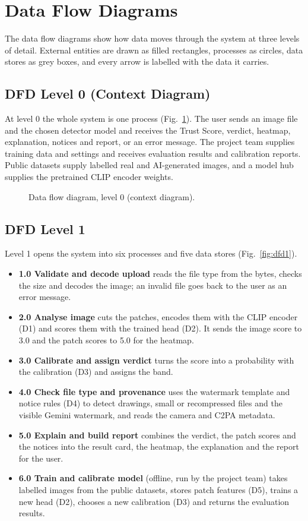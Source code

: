 \section{Data Flow Diagrams}
The data flow diagrams show how data moves through the system at three levels of detail. External entities are drawn as filled rectangles, processes as circles, data stores as grey boxes, and every arrow is labelled with the data it carries.

\subsection{DFD Level 0 (Context Diagram)}
At level 0 the whole system is one process (Fig.~\ref{fig:dfd0}). The user sends an image file and the chosen detector model and receives the Trust Score, verdict, heatmap, explanation, notices and report, or an error message. The project team supplies training data and settings and receives evaluation results and calibration reports. Public datasets supply labelled real and AI-generated images, and a model hub supplies the pretrained CLIP encoder weights.

\begin{figure}[htbp]
  \centering
  
  \caption{Data flow diagram, level 0 (context diagram).}\label{fig:dfd0}
\end{figure}

\subsection{DFD Level 1}
Level 1 opens the system into six processes and five data stores (Fig.~\ref{fig:dfd1}).
\begin{itemize}
  \item \textbf{1.0 Validate and decode upload} reads the file type from the bytes, checks the size and decodes the image; an invalid file goes back to the user as an error message.
  \item \textbf{2.0 Analyse image} cuts the patches, encodes them with the CLIP encoder (D1) and scores them with the trained head (D2). It sends the image score to 3.0 and the patch scores to 5.0 for the heatmap.
  \item \textbf{3.0 Calibrate and assign verdict} turns the score into a probability with the calibration (D3) and assigns the band.
  \item \textbf{4.0 Check file type and provenance} uses the watermark template and notice rules (D4) to detect drawings, small or recompressed files and the visible Gemini watermark, and reads the camera and C2PA metadata.
  \item \textbf{5.0 Explain and build report} combines the verdict, the patch scores and the notices into the result card, the heatmap, the explanation and the report for the user.
  \item \textbf{6.0 Train and calibrate model} (offline, run by the project team) takes labelled images from the public datasets, stores patch features (D5), trains a new head (D2), chooses a new calibration (D3) and returns the evaluation results.
\end{itemize}

